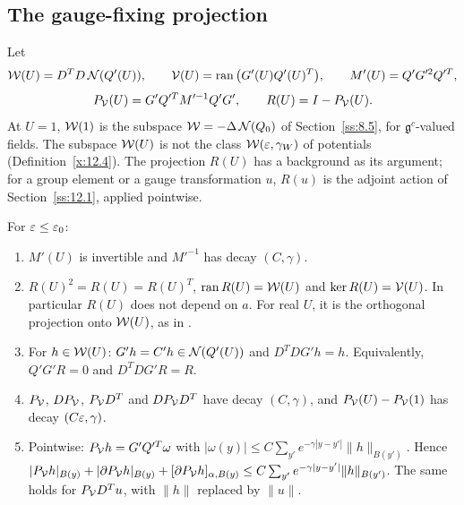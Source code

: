 \subsection{The gauge-fixing projection}\label{ss:14.1}

Let
\[
\mathcal W(U)=D^TD\,\mathcal N(Q'(U)),\qquad \mathcal V(U)=\operatorname{ran}\big(G'(U)Q'(U)^T\big),\qquad M'(U)=Q'G'^2Q'^T,
\]
\[
P_\mathcal V(U)=G'Q'^TM'^{-1}Q'G',\qquad R(U)=I-P_\mathcal V(U).
\]
At $U=1$, $\mathcal W(1)$ is the subspace $\mathcal W=-\Delta\,\mathcal N(Q_0)$ of Section~\ref{ss:8.5}, for $\mathfrak g^c$-valued fields. The subspace $\mathcal W(U)$ is not the class $\mathcal W(\varepsilon,\gamma_W)$ of potentials (Definition~\ref{x:12.4}). The projection $R(U)$ has a background as its argument; for a group element or a gauge transformation $u$, $R(u)$ is the adjoint action of Section~\ref{ss:12.1}, applied pointwise.

\begin{proposition}\label{prop:cov-R}
For $\varepsilon\le\varepsilon_0$:
\begin{enumerate}[label=(\alph*)]
\item $M'(U)$ is invertible and $M'^{-1}$ has decay $(C,\gamma)$.
\item $R(U)^2=R(U)=R(U)^T$, $\operatorname{ran} R(U)=\mathcal W(U)$ and $\ker R(U)=\mathcal V(U)$. In particular $R(U)$ does not depend on $a$. For real $U$, it is the orthogonal projection onto $\mathcal W(U)$, as in \cite[(3.21), (3.25)]{BalBackground}.
\item For $h\in\mathcal W(U)$: $G'h=C'h\in\mathcal N(Q'(U))$ and $D^TDG'h=h$. Equivalently, $Q'G'R=0$ and $D^TDG'R=R$.
\item $P_\mathcal V$, $DP_\mathcal V$, $P_\mathcal V D^T$ and $DP_\mathcal V D^T$ have decay $(C,\gamma)$, and $P_\mathcal V(U)-P_\mathcal V(1)$ has decay $(C\varepsilon,\gamma)$.
\item Pointwise: $P_\mathcal V h=G'Q'^T\omega$ with $|\omega(y)|\le C\sum_{y'}e^{-\gamma|y-y'|}\|h\|_{B(y')}$. Hence $|P_\mathcal V h|_{B(y)}+|\partial P_\mathcal V h|_{B(y)}+[\partial P_\mathcal V h]_{\alpha,B(y)}\le C\sum_{y'}e^{-\gamma|y-y'|}\|h\|_{B(y')}$. The same holds for $P_\mathcal V D^Tu$, with $\|h\|$ replaced by $\|u\|$.
\end{enumerate}
\end{proposition}

